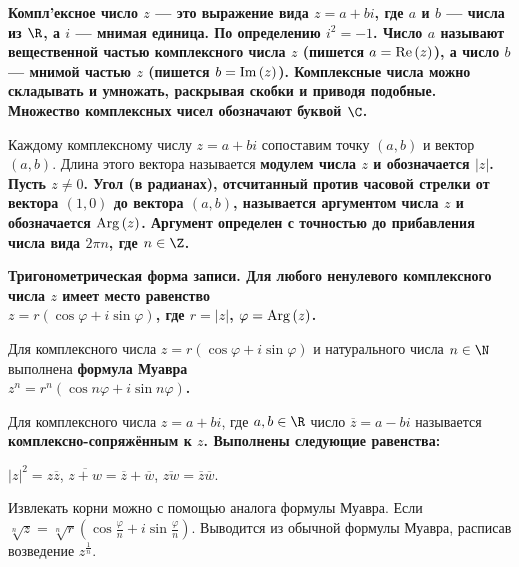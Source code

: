\begin{solution}
\bf{Компл'ексное число} \(z\) --- это выражение вида \(z=a+bi\), где \(a\) и \(b\) --- числа из \(\R\), а \(i\) --- \bf{мнимая единица}. По определению \(i^2=-1\).
Число \(a\) называют \bf{вещественной частью} комплексного числа \(z\) (пишется \(a={\rm Re}\,(z)\)), а число \(b\) --- \bf{мнимой частью} \(z\) (пишется \(b={\rm Im}\,(z)\)).
Комплексные числа можно складывать и умножать, \lgq раскрывая скобки и приводя подобные\rgq. Множество комплексных чисел обозначают буквой \(\C\).

Каждому комплексному числу \(z=a+bi\) сопоставим точку \((a,b)\) и вектор \((a,b)\). Длина этого вектора называется \bf{модулем} числа \(z\) и обозначается \(|z|\). Пусть \(z\ne0\).
Угол (в радианах), отсчитанный против часовой стрелки от вектора \((1,0)\) до вектора \((a,b)\), называется \bf{аргументом} числа \(z\) и обозначается \({\rm Arg}\,(z)\). Аргумент определен с точностью до прибавления числа вида \(2\pi n\), где \(n\in\Z\).

\bf{Тригонометрическая форма записи.} Для любого ненулевого комплексного числа \(z\) имеет место равенство\\ \(z=r (\cos \varphi +i\sin \varphi )\), где \(r=|z|\), \(\varphi={\rm Arg}\,(z)\).

Для комплексного числа \(z=r(\cos\varphi+i\sin\varphi)\) и натурального числа \(n\in\N\) выполнена \bf{формула Муавра}\\
\(z^n=r^n(\cos n\varphi+i\sin n\varphi)\).

Для комплексного числа \(z=a+bi\), где \(a,b\in \R\) число \(\overline{z}=a-bi\) называется \bf{комплексно-сопряжённым} к \(z\). Выполнены следующие равенства:

\(|z|^2=z\overline{z}\), \(\overline{z+w} = \overline{z} + \overline{w}\), \(\overline{zw}= \overline{z}\overline{w}\).

Извлекать корни можно с помощью аналога формулы Муавра. Если $\sqrt[n]{z}=\sqrt[n]{r}(\cos \frac{\varphi}{n}+i\sin \frac{\varphi}{n})$. Выводится из обычной формулы Муавра, расписав возведение $z^{\frac{1}{n}}$.
\end{solution}

\begin{problem}[10(2.2)]
\end{problem}

